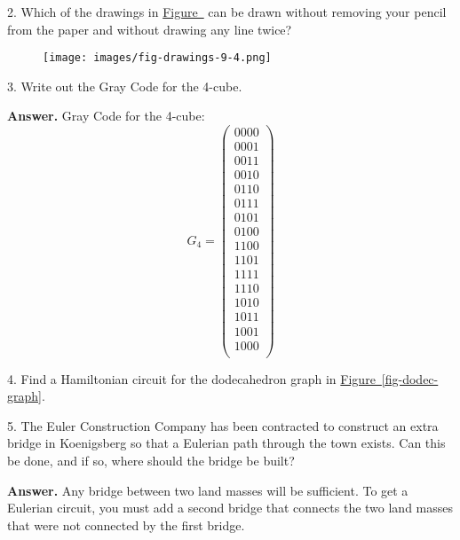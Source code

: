 \documentclass[10pt,]{book}
\theoremstyle{plain}
\theoremstyle{definition}
\theoremstyle{definition}
\theoremstyle{definition}
\theoremstyle{definition}
\theoremstyle{definition}
\numberwithin{equation}{section}
\begin{document}
\begin{exercisegroup}
%
\item[2.]\hypertarget{exercise-22}{} Which of the drawings in \hyperref[fig-drawings-9-4]{Figure~} can be drawn without removing your pencil from the paper and without drawing any line twice?%
\leavevmode%
\begin{figure}
\centering
\texttt{[image: images/fig-drawings-9-4.png]}
\end{figure}
\par\smallskip
\item[3.]\hypertarget{exercise-23}{}Write out the Gray Code for the 4-cube.%
\par\smallskip
\par\smallskip
\noindent\textbf{Answer.}\hypertarget{answer-7}{}\quad
 Gray Code for the 4-cube:
\[G_4=\left(
\begin{array}{c}
 0000 \\
 0001 \\
 0011 \\
 0010 \\
 0110 \\
 0111 \\
 0101 \\
 0100 \\
 1100 \\
 1101 \\
 1111 \\
 1110 \\
 1010 \\
 1011 \\
 1001 \\
 1000 \\
\end{array}
\right)\]
%
\item[4.]\hypertarget{exercise-24}{} Find a Hamiltonian circuit for the dodecahedron graph in \hyperref[fig-dodec-graph]{Figure~\ref{fig-dodec-graph}}.%
\par\smallskip
\item[5.]\hypertarget{exercise-25}{} The Euler Construction Company has been contracted to construct an extra bridge in Koenigsberg so that a Eulerian path through the town
exists. Can this be done, and if so, where should the bridge be built?%
\par\smallskip
\par\smallskip
\noindent\textbf{Answer.}\hypertarget{answer-8}{}\quad
 Any bridge between two land masses will be sufficient. To get a Eulerian circuit, you must add a second bridge that connects the two land masses
that were not connected by the first bridge.

\end{exercisegroup}
\end{document}
